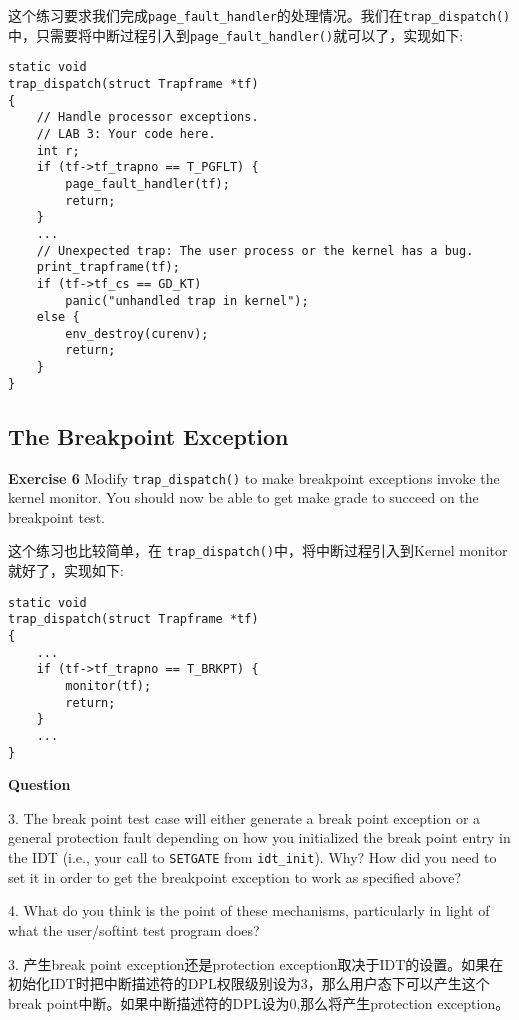 \documentclass[11pt]{article}
\begin{document}
这个练习要求我们完成\lstinline|page_fault_handler|的处理情况。我们在\lstinline|trap_dispatch()|中，只需要将中断过程引入到\lstinline|page_fault_handler()|就可以了，实现如下:

\begin{lstlisting}[title=kern/trap.c]
static void
trap_dispatch(struct Trapframe *tf)
{
	// Handle processor exceptions.
	// LAB 3: Your code here.
	int r;
	if (tf->tf_trapno == T_PGFLT) {
		page_fault_handler(tf);
		return;
	}
	...
	// Unexpected trap: The user process or the kernel has a bug.
	print_trapframe(tf);
	if (tf->tf_cs == GD_KT)
		panic("unhandled trap in kernel");
	else {
		env_destroy(curenv);
		return;
	}
}
\end{lstlisting}


\subsection{The Breakpoint Exception}
\begin{framed}
\noindent\textbf{Exercise 6} Modify \lstinline|trap_dispatch()| to make breakpoint exceptions invoke the kernel monitor. You should now be able to get make grade to succeed on the breakpoint test. 
\end{framed}

这个练习也比较简单，在 \lstinline|trap_dispatch()|中，将中断过程引入到Kernel monitor就好了，实现如下:
\begin{lstlisting}[title=kern/trap.c]
static void
trap_dispatch(struct Trapframe *tf)
{
	...
	if (tf->tf_trapno == T_BRKPT) {
		monitor(tf);
		return;
	}
	...
}
\end{lstlisting}

\begin{framed}
\noindent\textbf{Question}

3. The break point test case will either generate a break point exception or a general protection fault depending on how you initialized the break point entry in the IDT (i.e., your call to \lstinline|SETGATE| from \lstinline|idt_init|). Why? How did you need to set it in order to get the breakpoint exception to work as specified above?

4. What do you think is the point of these mechanisms, particularly in light of what the user/softint test program does?
\end{framed}

3. 产生break point exception还是protection exception取决于IDT的设置。如果在初始化IDT时把中断描述符的DPL权限级别设为3，那么用户态下可以产生这个break point中断。如果中断描述符的DPL设为0,那么将产生protection exception。
\end{document}
